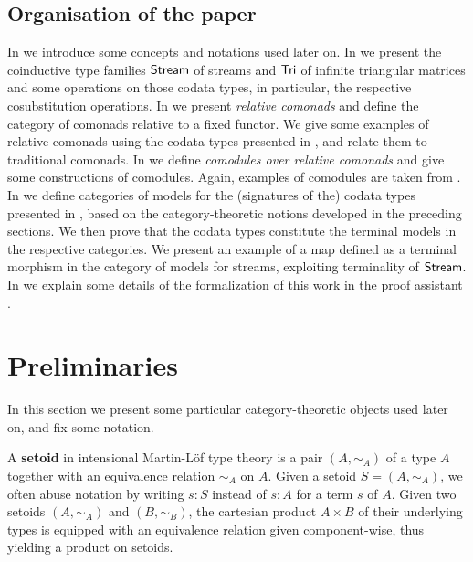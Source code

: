 \documentclass[a4paper,USenglish]{lipics}
\newcommand{\fat}[1]{\textbf{#1}}
\begin{document}
\begin{Long}
 
 \subsection{Organisation of the paper}
  In  we introduce some concepts and notations used later on.
  In  we present the coinductive type families $\mathsf{Stream}$ of streams and $\mathsf{Tri}$ of infinite triangular matrices and some operations on those codata types,
  in particular, the respective cosubstitution operations.
  In  we present \emph{relative comonads} and define the category of comonads relative to a fixed functor.
    We give some examples of relative comonads using the codata types presented in , 
    and relate them to traditional comonads.
  In  we define \emph{comodules over relative comonads} and give some constructions of comodules.
     Again, examples of comodules are taken from .
  In  we define categories of models for the (signatures of the) codata types presented in ,
      based on the category-theoretic notions developed in the preceding sections.
      We then prove that the codata types constitute the terminal models in the respective categories.
      We present an example of a map defined as a terminal morphism in the category of models for streams, exploiting terminality of $\mathsf{Stream}$.
  In  we explain some details of the formalization of this work in the proof assistant \coq.

\end{Long}


\section{Preliminaries}\label{sec:preliminaries}

In this section we present some particular category-theoretic objects used later on, and fix some notation.

\begin{defn}
  A \fat{setoid} in intensional Martin-Löf type theory is a pair $(A, \sim_A)$ of a type $A$ together with an equivalence 
  relation $\sim_A$ on $A$. Given a setoid $S = (A, \sim_A)$, we often abuse notation by writing $s:S$ instead of $s:A$ for
  a term $s$ of $A$.
  Given two setoids $(A,\sim_A)$ and $(B,\sim_B)$, the cartesian product $A\times B$ of their underlying types is equipped with
  an equivalence relation given component-wise, thus yielding a product on setoids.
\end{defn}
\end{document}
